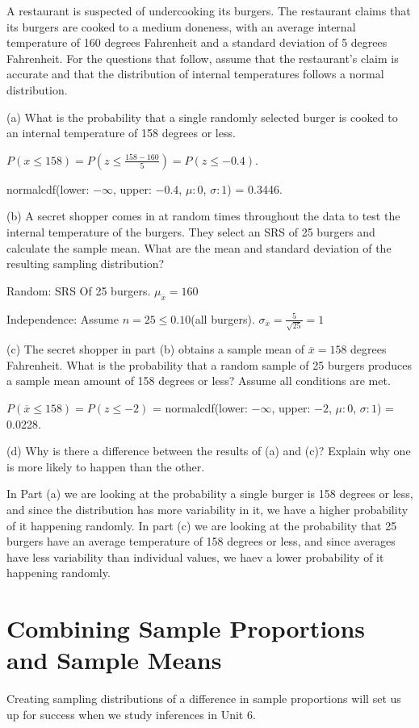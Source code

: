 \documentclass[../stats.tex]{subfiles}
\begin{document}
\begin{example}
    A restaurant is suspected of undercooking its burgers. The restaurant claims that its burgers are cooked to a medium doneness, with an average internal temperature of 160 degrees Fahrenheit and a standard deviation of 5 degrees Fahrenheit.
    For the questions that follow, assume that the restaurant's claim is accurate and that the distribution of internal temperatures follows a normal distribution.

    (a) What is the probability that a single randomly selected burger is cooked to an internal temperature of 158 degrees or less.

    $P(x\leq 158)=P(z\leq \frac{158-160}{5})=P(z\leq -0.4)$. 

    normalcdf(lower: $-\infty$, upper: $-0.4$, $\mu:0$, $\sigma:1$) = 0.3446.

    (b) A secret shopper comes in at random times throughout the data to test the internal temperature of the burgers. They select an SRS of 25 burgers and calculate the sample mean. What are the mean and standard deviation of the resulting sampling distribution?

    Random: SRS Of 25 burgers. $\mu_{\overline{x}}=160$

    Independence: Assume $n=25\leq 0.10$(all burgers). $\sigma_{\overline{x}}=\frac{5}{\sqrt{25}}=1$

    (c) The secret shopper in part (b) obtains a sample mean of $\overline{x}=158$ degrees Fahrenheit. What is the probability that a random sample of 25 burgers produces a sample mean amount of 158 degrees or less? Assume all conditions are met.

    $P(\overline{x}\leq 158)=P(z\leq -2)$ = normalcdf(lower: $-\infty$, upper: $-2$, $\mu:0$, $\sigma:1$) = 0.0228.

    (d) Why is there a difference between the results of (a) and (c)? Explain why one is more likely to happen than the other.

    In Part (a) we are looking at the probability a single burger is 158 degrees or less, and since the distribution has more variability in it, we have a higher probability of it happening randomly. In part (c) we are looking at the probability that 25 burgers have an average 
    temperature of 158 degrees or less, and since averages have less variability than individual values, we haev a lower probability of it happening randomly.
\end{example}

\section{Combining Sample Proportions and Sample Means}
Creating sampling distributions of a difference in sample proportions will set us up for success when we study inferences in Unit 6.
\end{document}
